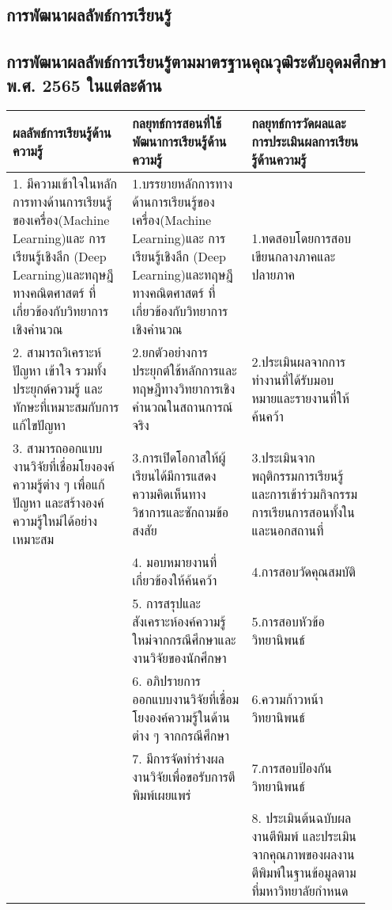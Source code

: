  \newpage
 \begin{landscape}
 \section{การพัฒนาผลลัพธ์การเรียนรู้}
 \subsection{การพัฒนาผลลัพธ์การเรียนรู้ตามมาตรฐานคุณวุฒิระดับอุดมศึกษา พ.ศ. 2565 ในแต่ละด้าน}
 
 \par\noindent\bigskip
 \renewcommand{\arraystretch}{1.3}
 \begin{tabular}{|p{0.3\linewidth}|p{0.3\linewidth}|p{0.3\linewidth}|}
\hline
\textbf{ผลลัพธ์การเรียนรู้ด้านความรู้} & \textbf{กลยุทธ์การสอนที่ใช้พัฒนาการเรียนรู้ด้านความรู้} & \textbf{กลยุทธ์การวัดผลและการประเมินผลการเรียนรู้ด้านความรู้} \\
\hline 
1. มีความเข้าใจในหลักการทางด้านการเรียนรู้ของเครื่อง(Machine Learning)และ การเรียนรู้เชิงลึก (Deep Learning)และทฤษฎีทางคณิตศาสตร์ ที่เกี่ยวข้องกับวิทยาการเชิงคำนวณ & 1.บรรยายหลักการทางด้านการเรียนรู้ของเครื่อง(Machine Learning)และ การเรียนรู้เชิงลึก (Deep Learning)และทฤษฎีทางคณิตศาสตร์ ที่เกี่ยวข้องกับวิทยาการเชิงคำนวณ & 1.ทดสอบโดยการสอบเขียนกลางภาคและปลายภาค \\ 
2. สามารถวิเคราะห์ปัญหา เข้าใจ รวมทั้งประยุกต์ความรู้ และทักษะที่เหมาะสมกับการแก้ไขปัญหา & 2.ยกตัวอย่างการประยุกต์ใช้หลักการและทฤษฎีทางวิทยาการเชิงคำนวณในสถานการณ์จริง & 2.ประเมินผลจากการทำงานที่ได้รับมอบหมายและรายงานที่ให้ค้นคว้า \\ 
3. สามารถออกแบบงานวิจัยที่เชื่อมโยงองค์ความรู้ต่าง ๆ เพื่อแก้ปัญหา และสร้างองค์ความรู้ใหม่ได้อย่างเหมาะสม & 3.การเปิดโอกาสให้ผู้เรียนได้มีการแสดงความคิดเห็นทางวิชาการและซักถามข้อสงสัย & 3.ประเมินจากพฤติกรรมการเรียนรู้ และการเข้าร่วมกิจกรรมการเรียนการสอนทั้งในและนอกสถานที่ \\ 
& 4. มอบหมายงานที่เกี่ยวข้องให้ค้นคว้า & 4.การสอบวัดคุณสมบัติ \\ 
& 5. การสรุปและสังเคราะห์องค์ความรู้ใหม่จากกรณีศึกษาและงานวิจัยของนักศึกษา & 5.การสอบหัวข้อวิทยานิพนธ์\\  
& 6. อภิปรายการออกแบบงานวิจัยที่เชื่อมโยงองค์ความรู้ในด้านต่าง ๆ จากกรณีศึกษา & 6.ความก้าวหน้าวิทยานิพนธ์ \\  
& 7. มีการจัดทำร่างผลงานวิจัยเพื่อขอรับการตีพิมพ์เผยแพร่ & 7.การสอบป้องกันวิทยานิพนธ์ \\  
& & 8. ประเมินต้นฉบับผลงานตีพิมพ์ และประเมินจากคุณภาพของผลงานตีพิมพ์ในฐานข้อมูลตามที่มหาวิทยาลัยกำหนด \\ \hline
 \end{tabular}
 

\end{landscape}
